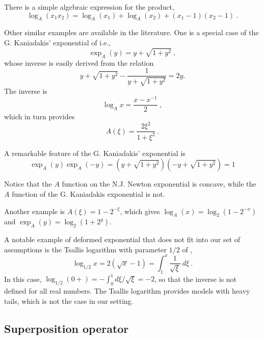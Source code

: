 \documentclass[graybox]{svmult}
\begin{document}
There is a simple algebraic expression for the product,
\begin{equation*}
  \log_A(x_1x_2) = \log_A(x_1) + \log_A(x_2) + (x_1-1)(x_2-1) \ .
\end{equation*}

Other similar examples are available in the literature. One is a special
case of the G. Kaniadakis' exponential of \cite{kaniadakis:2001PhA} i.e., 
\begin{equation*}
\exp_A(y) = y + \sqrt{1+y^2} \ ,
\end{equation*}
whose inverse is easily derived from the relation 
\begin{equation*}
y + \sqrt{1+y^2} - \frac1{y + \sqrt{1+y^2}}=2y.
\end{equation*}
The inverse is 
\begin{equation*}
\log_A x = \frac{x-x^{-1}}2 \ ,
\end{equation*}
which in turn provides 
\begin{equation*}
A(\xi) = \frac{2\xi^2}{1+\xi^2} \ .
\end{equation*}

A remarkable feature of the G. Kaniadakis' exponential is 
\begin{equation*}
\exp_A(y)\exp_A(-y) = \left(y+\sqrt{1+y^2}\right)\left(-y+\sqrt{1+y^2}
\right) = 1
\end{equation*}

Notice that the $A$ function on the N.J. Newton exponential is concave, while the $A$ function of the G. Kaniadakis exponential is not.

Another example is $A(\xi) = 1 - 2^{-\xi}$, which gives $\log_A(x) = \log_2(1 - 2^{-x})$ and $\exp_A(y) = \log_2(1+2^y)$. 

A notable example of deformed exponential that does not fit into our set of
assumptions is the Tsallis logarithm with parameter $1/2$ of \cite{tsallis:1988}, 
\begin{equation*}
\log _{1/2}x=2\left( \sqrt{x}-1\right) =\int_{1}^{x}\frac{1}{\sqrt{\xi }}\
d\xi \ .  \label{eq:tsallislog}
\end{equation*}
In this case, $\log _{1/2}(0+)=-\int_{0}^{1}d\xi /\sqrt{\xi }=-2$, so that
the inverse is not defined for all real numbers. The Tsallis logarithm provides models with heavy tails, which is not the case in our setting.

\subsection{Superposition operator}
\label{sec:superposition-operator}
\end{document}
